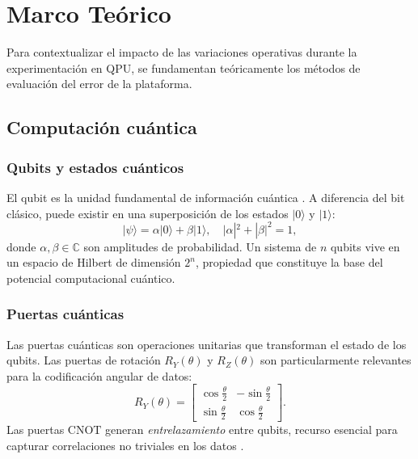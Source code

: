 \section{Marco Te\'orico}
\label{sec:marco_teorico}

Para contextualizar el impacto de las variaciones operativas durante la experimentaci\'on en QPU, se fundamentan te\'oricamente los m\'etodos de evaluaci\'on del error de la plataforma.

\subsection{Computaci\'on cu\'antica}

\subsubsection{Qubits y estados cu\'anticos}
El qubit es la unidad fundamental de informaci\'on cu\'antica
\citep{nielsen2010}. A diferencia del bit cl\'asico, puede existir en
una superposici\'on de los estados $|0\rangle$ y $|1\rangle$:
\begin{equation}
|\psi\rangle = \alpha|0\rangle + \beta|1\rangle,
\quad |\alpha|^2 + |\beta|^2 = 1,
\end{equation}
donde $\alpha, \beta \in \mathbb{C}$ son amplitudes de probabilidad. Un
sistema de $n$ qubits vive en un espacio de Hilbert de dimensi\'on
$2^n$, propiedad que constituye la base del potencial computacional
cu\'antico.

\subsubsection{Puertas cu\'anticas}
Las puertas cu\'anticas son operaciones unitarias que transforman el
estado de los qubits. Las puertas de rotaci\'on $R_Y(\theta)$ y
$R_Z(\theta)$ son particularmente relevantes para la codificaci\'on
angular de datos:
\begin{equation}
R_Y(\theta) = \begin{bmatrix}
\cos\tfrac{\theta}{2} & -\sin\tfrac{\theta}{2} \\
\sin\tfrac{\theta}{2} &  \cos\tfrac{\theta}{2}
\end{bmatrix}.
\end{equation}
Las puertas $\mathrm{CNOT}$ generan \emph{entrelazamiento} entre qubits,
recurso esencial para capturar correlaciones no triviales en los datos
\citep{nielsen2010}.

